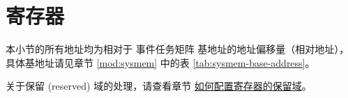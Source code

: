 \documentclass[main\_\_CN.tex]{subfiles}
\begin{document}

\newpage
\section{寄存器}

本小节的所有地址均为相对于 事件任务矩阵 基地址的地址偏移量（相对地址），具体基地址请见章节 \ref{mod:sysmem} \textit{} 中的表 \ref{tab:sysmem-base-address}。

关于保留 (reserved) 域的处理，请查看章节 \hyperref[programming-reserved-field]{如何配置寄存器的保留域}。

\end{document}
